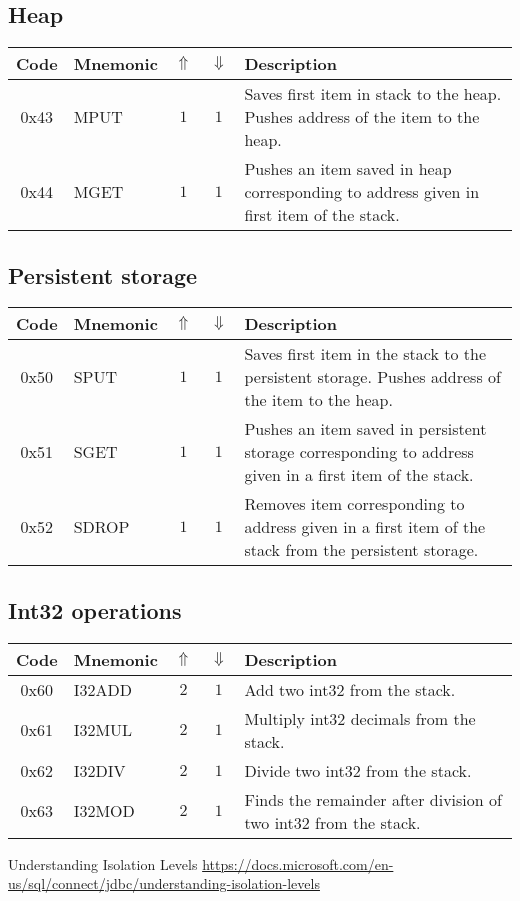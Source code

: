 \documentclass[12pt,a4paper]{article}
\begin{document}
\subsection{Heap}
\begin{tabularx}{\textwidth}{ c l c c p{7cm} }
\textbf{Code} & \textbf{Mnemonic} & \textbf{$\Uparrow$} & \textbf{$\Downarrow$} & \textbf{Description} \\
\hline
0x43 & MPUT & $1$ & $1$ & Saves first item in stack to the heap. Pushes address of the item to the heap. \\
\hline
0x44 & MGET & $1$ & $1$ & Pushes an item saved in heap corresponding to address given in first item of the stack.  \\
\hline
\end{tabularx}

\subsection{Persistent storage}
\begin{tabularx}{\textwidth}{ c l c c p{7cm} }
\textbf{Code} & \textbf{Mnemonic} & \textbf{$\Uparrow$} & \textbf{$\Downarrow$} & \textbf{Description} \\
\hline
0x50 & SPUT & $1$ & $1$ & Saves first item in the stack to the persistent storage. Pushes address of the item to the heap. \\
\hline
0x51 & SGET & $1$ & $1$ & Pushes an item saved in persistent storage corresponding to address given in a first item of the stack.  \\
\hline
0x52 & SDROP & $1$ & $1$ & Removes item corresponding to address given in a first item of the stack from the persistent storage.  \\
\hline
\end{tabularx}

\subsection{Int32 operations}
\begin{tabularx}{\textwidth}{ c l c c p{7cm} }
\textbf{Code} & \textbf{Mnemonic} & \textbf{$\Uparrow$} & \textbf{$\Downarrow$} & \textbf{Description} \\
\hline
0x60 & I32ADD & $2$ & $1$ & Add two int32 from the stack. \\
\hline
0x61 & I32MUL & $2$ & $1$ & Multiply int32 decimals from the stack. \\
\hline
0x62 & I32DIV & $2$ & $1$ & Divide two int32 from the stack. \\
\hline
0x63 & I32MOD & $2$ & $1$ & Finds the remainder after division of two int32 from the stack. \\
\hline
\end{tabularx}

\begin{thebibliography}{9}

 Understanding Isolation Levels \url{https://docs.microsoft.com/en-us/sql/connect/jdbc/understanding-isolation-levels}
\end{thebibliography}
\end{document}
